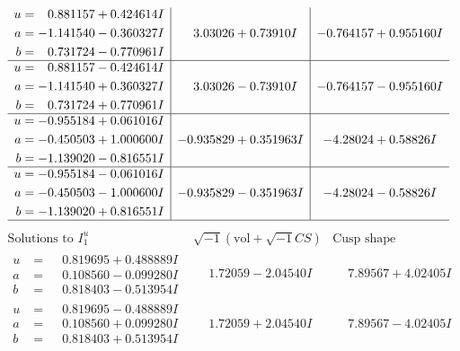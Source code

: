 \documentclass[1p]{elsarticle_modified}
\theoremstyle{definition}
\newcommand{\I}{\sqrt{-1}}
\begin{document}
$$\begin{array}{c|c|c}
\begin{aligned}
u &= \phantom{-}0.881157 + 0.424614 I \\
a &= -1.141540 - 0.360327 I \\
b &= \phantom{-}0.731724 - 0.770961 I\end{aligned}
 & \phantom{-}3.03026 + 0.73910 I & -0.764157 + 0.955160 I \\ \hline\begin{aligned}
u &= \phantom{-}0.881157 - 0.424614 I \\
a &= -1.141540 + 0.360327 I \\
b &= \phantom{-}0.731724 + 0.770961 I\end{aligned}
 & \phantom{-}3.03026 - 0.73910 I & -0.764157 - 0.955160 I \\ \hline\begin{aligned}
u &= -0.955184 + 0.061016 I \\
a &= -0.450503 + 1.000600 I \\
b &= -1.139020 - 0.816551 I\end{aligned}
 & -0.935829 + 0.351963 I & -4.28024 + 0.58826 I \\ \hline\begin{aligned}
u &= -0.955184 - 0.061016 I \\
a &= -0.450503 - 1.000600 I \\
b &= -1.139020 + 0.816551 I\end{aligned}
 & -0.935829 - 0.351963 I & -4.28024 - 0.58826 I\\
 \hline 
 \end{array}$$\newpage$$\begin{array}{c|c|c}  
\text{Solutions to }I^u_{1}& \I (\text{vol} + \sqrt{-1}CS) & \text{Cusp shape}\\
 \hline 
\begin{aligned}
u &= \phantom{-}0.819695 + 0.488889 I \\
a &= \phantom{-}0.108560 - 0.099280 I \\
b &= \phantom{-}0.818403 - 0.513954 I\end{aligned}
 & \phantom{-}1.72059 - 2.04540 I & \phantom{-}7.89567 + 4.02405 I \\ \hline\begin{aligned}
u &= \phantom{-}0.819695 - 0.488889 I \\
a &= \phantom{-}0.108560 + 0.099280 I \\
b &= \phantom{-}0.818403 + 0.513954 I\end{aligned}
 & \phantom{-}1.72059 + 2.04540 I & \phantom{-}7.89567 - 4.02405 I \\ \hline\begin{aligned}

\end{aligned}
\end{array}$$
\end{document}
